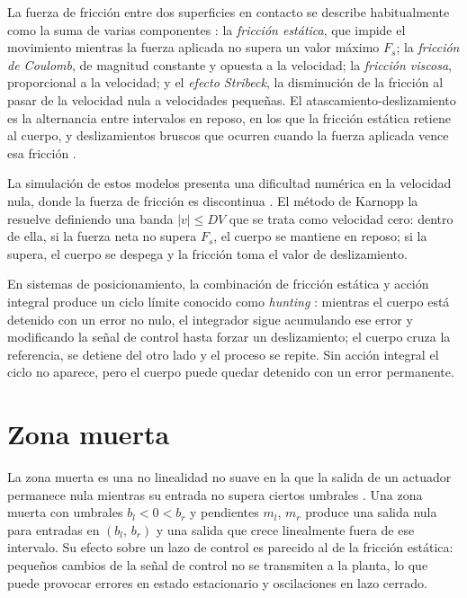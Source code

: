 La fuerza de fricción entre dos superficies en contacto se describe habitualmente como la suma de varias componentes \cite{olsson,armstrong}: la \emph{fricción estática}, que impide el movimiento mientras la fuerza aplicada no supera un valor máximo $F_s$; la \emph{fricción de Coulomb}, de magnitud constante y opuesta a la velocidad; la \emph{fricción viscosa}, proporcional a la velocidad; y el \emph{efecto Stribeck}, la disminución de la fricción al pasar de la velocidad nula a velocidades pequeñas. El atascamiento-deslizamiento es la alternancia entre intervalos en reposo, en los que la fricción estática retiene al cuerpo, y deslizamientos bruscos que ocurren cuando la fuerza aplicada vence esa fricción \cite{berman,armstrong}.

La simulación de estos modelos presenta una dificultad numérica en la velocidad nula, donde la fuerza de fricción es discontinua \cite{haessig}. El método de Karnopp \cite{karnopp} la resuelve definiendo una banda $|v|\le DV$ que se trata como velocidad cero: dentro de ella, si la fuerza neta no supera $F_s$, el cuerpo se mantiene en reposo; si la supera, el cuerpo se despega y la fricción toma el valor de deslizamiento.

En sistemas de posicionamiento, la combinación de fricción estática y acción integral produce un ciclo límite conocido como \emph{hunting} \cite{olsson,armstrong}: mientras el cuerpo está detenido con un error no nulo, el integrador sigue acumulando ese error y modificando la señal de control hasta forzar un deslizamiento; el cuerpo cruza la referencia, se detiene del otro lado y el proceso se repite. Sin acción integral el ciclo no aparece, pero el cuerpo puede quedar detenido con un error permanente.

\section{Zona muerta}

La zona muerta es una no linealidad no suave en la que la salida de un actuador permanece nula mientras su entrada no supera ciertos umbrales \cite{gang}. Una zona muerta con umbrales $b_l<0<b_r$ y pendientes $m_l$, $m_r$ produce una salida nula para entradas en $(b_l,\,b_r)$ y una salida que crece linealmente fuera de ese intervalo. Su efecto sobre un lazo de control es parecido al de la fricción estática: pequeños cambios de la señal de control no se transmiten a la planta, lo que puede provocar errores en estado estacionario y oscilaciones en lazo cerrado.

